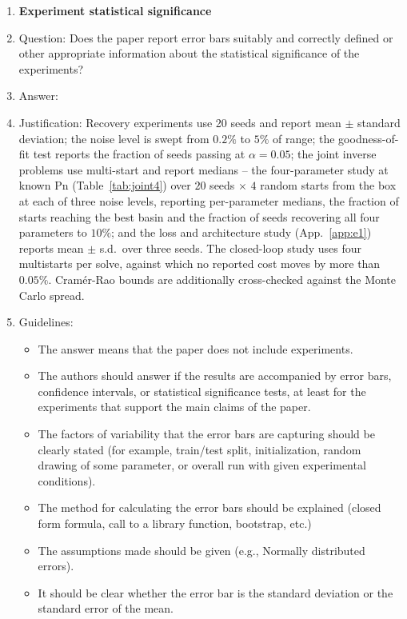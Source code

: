 \begin{enumerate}
\item {\bf Experiment statistical significance}
    \item[] Question: Does the paper report error bars suitably and correctly defined or other appropriate information about the statistical significance of the experiments?
    \item[] Answer: \answerYes{} %
    \item[] Justification: Recovery experiments use 20 seeds and report mean $\pm$ standard deviation; the noise level is swept from $0.2\%$ to $5\%$ of range; the goodness-of-fit test reports the fraction of seeds passing at $\alpha{=}0.05$; the joint inverse problems use multi-start and report medians -- the four-parameter study at known $\mathrm{Pn}$ (Table~\ref{tab:joint4}) over $20$ seeds $\times$ $4$ random starts from the box at each of three noise levels, reporting per-parameter medians, the fraction of starts reaching the best basin and the fraction of seeds recovering all four parameters to $10\%$; and the loss and architecture study (App.~\ref{app:e1}) reports mean $\pm$ s.d.\ over three seeds. The closed-loop study uses four multistarts per solve, against which no reported cost moves by more than $0.05\%$. Cram\'er-Rao bounds are additionally cross-checked against the Monte Carlo spread.
    \item[] Guidelines:
    \begin{itemize}
        \item The answer \answerNA{} means that the paper does not include experiments.
        \item The authors should answer \answerYes{} if the results are accompanied by error bars, confidence intervals, or statistical significance tests, at least for the experiments that support the main claims of the paper.
        \item The factors of variability that the error bars are capturing should be clearly stated (for example, train/test split, initialization, random drawing of some parameter, or overall run with given experimental conditions).
        \item The method for calculating the error bars should be explained (closed form formula, call to a library function, bootstrap, etc.)
        \item The assumptions made should be given (e.g., Normally distributed errors).
        \item It should be clear whether the error bar is the standard deviation or the standard error of the mean.

\end{itemize}
\end{enumerate}

